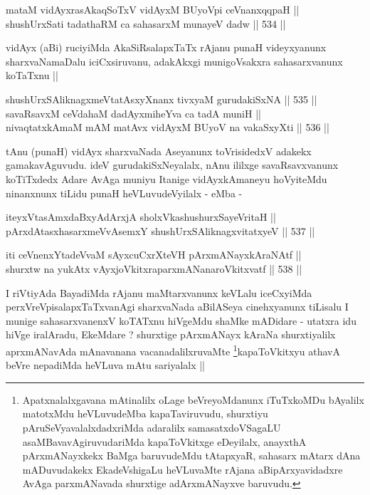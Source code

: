 
\begin{shl}
mataM vidAyxrasAkaqSoTxV vidAyxM BUyoV\s pi ceVnanxqqpaH || \\
shushUrxSati tadathaRM ca sahasarxM munayeV dadw ||  534 ||  
\end{shl}

\begin{artha}
vidAyx (aBi) ruciyiMda AkaSiRsalapxTaTx rAjanu punaH videyxyanunx
sharxvaNamaDalu iciCxsiruvanu, adakAkxgi munigoVsakxra sahasarxvanunx
koTaTxnu ||
\end{artha}


\begin{shl}
shushUrxSAliknagxmeVtatAsxyXnanx tivxyaM gurudakiSxNA ||  535 ||  \\
savaRsavxM ceVdahaM dadAyxmiheYva ca tadA muniH || \\
nivaqtatxkAmaM mAM matAvx vidAyxM BUyoV na vakaSxyXti ||  536 ||  
\end{shl}

\begin{artha}
tAnu (punaH) vidAyx sharxvaNada Aseyanunx toVrisidedxV adakekx
gamakavAguvudu. ideV gurudakiSxNeyalalx, nAnu ililxge savaRsavxvanunx
koTiTxdedx Adare AvAga muniyu Itanige vidAyxkAmaneyu hoVyiteMdu
ninanxnunx tiLidu punaH heVLuvudeVyilalx - eMba -
\end{artha}


\begin{shl}
iteyxVtasAmxdaBxyAdArxjA sholxVkashushurxSayeVritaH || \\
pArxdAtasxhasarxmeVvAsemxY shushUrxSAliknagxvitatxyeV ||  537 ||  
\end{shl}
				
\begin{shl}
iti ceVnenxYtadeVvaM sAyxcuCxrXteVH pArxmANayxkAraNAtf || \\
shurxtw na yukAtx vAyxjoVkitxraparxmANanaroVkitxvatf ||  538 ||  
\end{shl}

\begin{artha}
I riVtiyAda BayadiMda rAjanu maMtarxvanunx keVLalu iceCxyiMda
perxVreVpisalapxTaTxvanAgi sharxvaNada aBilASeya cinehxyanunx tiLisalu
I munige sahasarxvanenxV koTATxnu hiVgeMdu shaMke mADidare - utatxra
idu hiVge iralAradu, EkeMdare ? shurxtige pArxmANayx kAraNa
shurxtiyalilx aprxmANavAda mAnavanana
vacanadalilxruvaMte \footnote{Apatxnalalxgavana mAtinalilx oLage
  beVreyoMdanunx iTuTxkoMDu bAyalilx matotxMdu heVLuvudeMba
  kapaTaviruvudu, shurxtiyu pAruSeVyavalalxdadxriMda adaralilx
  samasatxdoVSagaLU asaMBavavAgiruvudariMda kapaToVkitxge eDeyilalx,
  anayxthA pArxmANayxkekx BaMga baruvudeMdu tAtapxyaR, sahasarx mAtarx
  dAna mADuvudakekx EkadeVshigaLu heVLuvaMte rAjana aBipArxyavidadxre
  AvAga parxmANavada shurxtige adArxmANayxve baruvudu.}kapaToVkitxyu athavA beVre nepadiMda
heVLuva mAtu sariyalalx ||
\end{artha}

